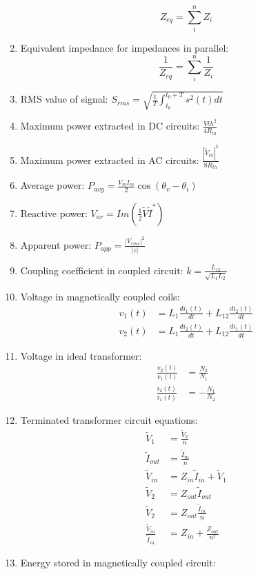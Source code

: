 \documentclass[twocolumn]{article}
\begin{document}
\begin{enumerate}
    \[Z_{eq} = \sum_{i}^{n} Z_i\]
    \item Equivalent impedance for impedances in parallel: 
    \[\frac{1}{Z_{eq}} = \sum_{i}^{n} \frac{1}{Z_i}\]
    \item RMS value of signal: $S_{rms} = \sqrt{\frac{1}{T}\int_{t_0}^{t_0+T} s^2(t) dt}$
    \item Maximum power extracted in DC circuits: $\frac{V{th}^2}{4R_{th}}$
    \item Maximum power extracted in AC circuits: $\frac{|\tilde{V}_{th}|^2}{8R_{th}}$
    \item Average power: $P_{avg} = \frac{V_m I_m}{2}\cos{(\theta_v - \theta_i)}$
    \item Reactive power: $V_{ar} = Im(\frac{1}{2}\tilde{V}\tilde{I}^*)$
    \item Apparent power: $P_{app} = \frac{|V_{rms}|^2}{|z|}$
    \item Coupling coefficient in coupled circuit: $k = \frac{L_{12}}{\sqrt{L_1 L_2}}$
    \item Voltage in magnetically coupled coils: 
    \begin{align*}
        v_{1}(t) &= L_1 \frac{di_1(t)}{dt} + L_{12}\frac{di_2(t)}{dt} \\
        v_{2}(t) &= L_1 \frac{di_2(t)}{dt} + L_{12}\frac{di_1(t)}{dt} 
    \end{align*}
    \item Voltage in ideal transformer: 
    \begin{align*}
        \frac{v_2(t)}{v_1(t)} &= \frac{N_2}{N_1} \\
        \frac{i_2(t)}{i_1(t)} &= -\frac{N_1}{N_2}   
    \end{align*}
    \item Terminated transformer circuit equations: 
    \begin{align*}
        \tilde{V}_1 &= \frac{\tilde{V}_2}{n} \\
        \tilde{I}_{out} &= \frac{\tilde{I}_{in}}{n} \\
        \tilde{V}_{in} &= Z_{in}\tilde{I}_{in} + \tilde{V}_1 \\
        \tilde{V}_2 &= Z_{out}\tilde{I}_{out} \\
        \tilde{V}_2 &= Z_{out}\frac{\tilde{I}_{in}}{n} \\
        \frac{\tilde{V}_{in}}{\tilde{I}_{in}} &= Z_{in} + \frac{Z_{out}}{n^2}
    \end{align*}
    \item Energy stored in magnetically coupled circuit: 

\end{enumerate}
\end{document}
